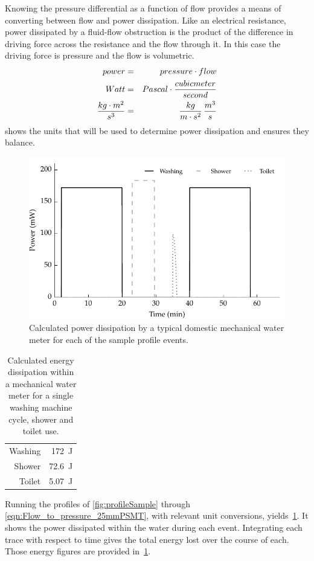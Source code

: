     Knowing the pressure differential as a function of flow provides a means of converting between flow and power dissipation.
    Like an electrical resistance, power dissipated by a fluid-flow obstruction is the product of the difference in driving force across the resistance and the flow through it.
    In this case the driving force is pressure and the flow is volumetric.
    \begin{eqnarray}
        power &=& pressure \cdot flow\nonumber \\
        Watt &=& Pascal \cdot \frac{cubic meter}{second}\nonumber \\
        \frac{kg\cdot m^{2}}{s^{3}} &=& \frac{kg}{m\cdot  s^{2}} \thinspace \frac{m^{3}}{s}\\
        \label{eqn:pressure_flow_to_power}
    \end{eqnarray}
     shows the units that will be used to determine power dissipation and ensures they balance.
    \begin{figure}
        \centering
        \includegraphics[width=\linewidth]{content/pt1/02-WirelessWaterMeter/graphics/graph_harvest}
        \caption{Calculated power dissipation by a typical domestic mechanical water meter for each of the sample profile events.}
        \label{fig:powerDissipated_meter}
    \end{figure}
    \begin{table}
      \centering
      \begin{tabular}{r|r}
          Washing & \SI{172}{\joule}\\
          Shower  & \SI{72.6}{\joule}\\
          Toilet  & \SI{5.07}{\joule}
      \end{tabular}
      \caption{
          \label{tab:energy_dissipation_figures}
          Calculated energy dissipation within a mechanical water meter for a single washing machine cycle, shower and toilet use.
      }
    \end{table}
    Running the profiles of \cref{fig:profileSample} through \cref{eqn:Flow_to_pressure_25mmPSMT}, with relevant unit conversions, yields~\cref{fig:powerDissipated_meter}.
    It shows the power dissipated within the water during each event.
    Integrating each trace with respect to time gives the total energy lost over the course of each.
    Those energy figures are provided in~\cref{tab:energy_dissipation_figures}.

